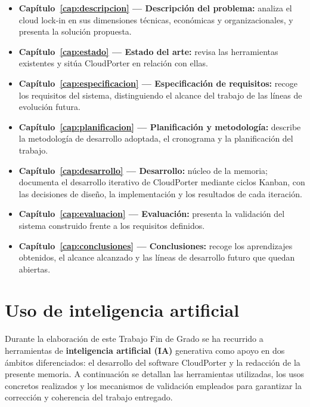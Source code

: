 \begin{itemize}
    \item \textbf{Capítulo~\ref{cap:descripcion} — Descripción del problema:}
    analiza el cloud lock-in en sus dimensiones técnicas, económicas y
    organizacionales, y presenta la solución propuesta.

    \item \textbf{Capítulo~\ref{cap:estado} — Estado del arte:}
    revisa las herramientas existentes y sitúa CloudPorter en relación con ellas.

    \item \textbf{Capítulo~\ref{cap:especificacion} — Especificación de requisitos:}
    recoge los requisitos del sistema, distinguiendo el alcance del trabajo de
    las líneas de evolución futura.

    \item \textbf{Capítulo~\ref{cap:planificacion} — Planificación y metodología:}
    describe la metodología de desarrollo adoptada, el cronograma y la planificación
    del trabajo.

    \item \textbf{Capítulo~\ref{cap:desarrollo} — Desarrollo:}
    núcleo de la memoria; documenta el desarrollo iterativo de CloudPorter mediante
    ciclos Kanban, con las decisiones de diseño, la implementación y los resultados
    de cada iteración.

    \item \textbf{Capítulo~\ref{cap:evaluacion} — Evaluación:}
    presenta la validación del sistema construido frente a los requisitos definidos.

    \item \textbf{Capítulo~\ref{cap:conclusiones} — Conclusiones:}
    recoge los aprendizajes obtenidos, el alcance alcanzado y las líneas de
    desarrollo futuro que quedan abiertas.
\end{itemize}

\section{Uso de inteligencia artificial}

Durante la elaboración de este Trabajo Fin de Grado se ha recurrido a herramientas de
\textbf{inteligencia artificial (IA)} generativa como apoyo en dos ámbitos diferenciados:
el desarrollo del software CloudPorter y la redacción de la presente memoria. A continuación
se detallan las herramientas utilizadas, los usos concretos realizados y los mecanismos de
validación empleados para garantizar la corrección y coherencia del trabajo entregado.

